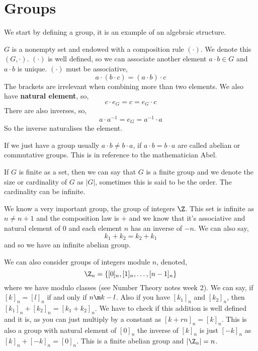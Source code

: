 
\section{Groups}
We start by defining a group, it is an example of an algebraic structure.
\begin{ndefi}[Group]
  $G$ is a nonempty set and endowed with a composition rule $(\cdot)$. We denote this $(G, \cdot)$. $(\cdot)$ is well defined, so we can associate another element $a \cdot b \in G$ and $a \cdot b$ is unique. $(\cdot)$ must be associative,
  $$ a \cdot (b \cdot c) = (a \cdot b) \cdot c $$
  The brackets are irrelevant when combining more than two elements. We also have \textbf{natural element}, so,
  $$ c \cdot e_G = c = e_G \cdot c $$
  There are also inverses, so,
  $$ a \cdot a^{-1} = e_G = a^{-1} \cdot a $$
  So the inverse naturalises the element.
\end{ndefi}

\noindent
If we just have a group usually $a \cdot b \ne b \cdot a$, if $a \cdot b = b \cdot a$ are called abelian or commutative groups. This is in reference to the mathematician Abel.

\noindent
If $G$ is finite as a set, then we can say that $G$ is a finite group and we denote the size or cardinality of $G$ as $|G|$, sometimes this is said to be the order. The cardinality can be infinite.\\

\noindent
\begin{eg}
  We know a very important group, the group of integers $\Z$. This set is infinite as $n \ne n + 1$ and the composition law is $+$ and we know that it's associative and natural element of $0$ and each element $n$ has an inverse of $-n$. We can also say,
  $$ k_1 + k_2 = k_2 + k_1 $$
  and so we have an infinite abelian group.
\end{eg}

\begin{eg}
  We can also consider groups of integers module $n$, denoted,
  $$ \Z_n = \{[0]_n, [1]_n, \dots, [n-1]_n\} $$
  where we have modulo classes (see Number Theory notes week 2). We can say, if $[k]_n = [l]_n$ if and only if $n \m k - l$. Also if you have $[k_1]_n$ and $[k_2]_n$, then $[k_1]_n + [k_2]_n = [k_1 + k_2]_n$. We have to check if this addition is well defined and it is, as you can just multiply by a constant as $[k+ rn]_n = [k]_n$. This is also a group with natural element of $[0]_n$ the inverse of $[k]_n$ is just $[-k]_n$ as $[k]_n + [-k]_n = [0]_n$. This is a finite abelian group and $|\Z_n| = n$.
\end{eg}

